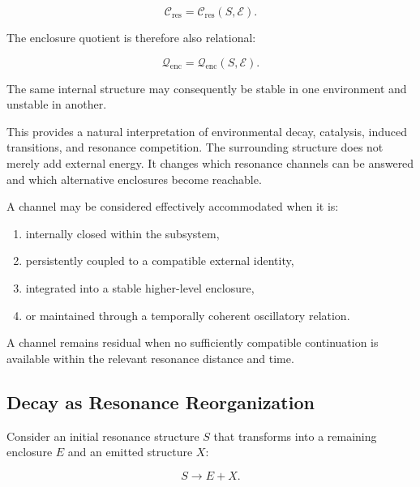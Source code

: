 \documentclass[11pt,a4paper]{article}
\begin{document}
\begin{equation}
    \mathcal{C}_{\mathrm{res}}
    =
    \mathcal{C}_{\mathrm{res}}(S,\mathcal{E}).
\end{equation}

The enclosure quotient is therefore also relational:

\begin{equation}
    \mathcal{Q}_{\mathrm{enc}}
    =
    \mathcal{Q}_{\mathrm{enc}}(S,\mathcal{E}).
\end{equation}

The same internal structure may consequently be stable in one environment and unstable in another.

This provides a natural interpretation of environmental decay, catalysis, induced transitions, and resonance competition. The surrounding structure does not merely add external energy. It changes which resonance channels can be answered and which alternative enclosures become reachable.

A channel may be considered effectively accommodated when it is:

\begin{enumerate}
    \item internally closed within the subsystem,
    \item persistently coupled to a compatible external identity,
    \item integrated into a stable higher-level enclosure,
    \item or maintained through a temporally coherent oscillatory relation.
\end{enumerate}

A channel remains residual when no sufficiently compatible continuation is available within the relevant resonance distance and time.



\subsection{Decay as Resonance Reorganization}
\label{sec:decay_resonance_reorganization}

Consider an initial resonance structure $S$ that transforms into a remaining enclosure $E$ and an emitted structure $X$:

\begin{equation}
    S \rightarrow E + X.
    \label{eq:resonance_decay}
\end{equation}
\end{document}
